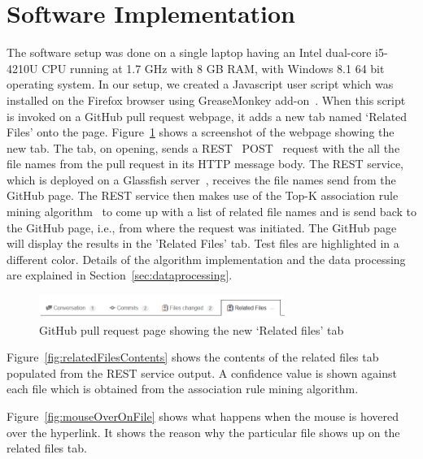 
\section{Software Implementation}
\label{sec:setup}

The software setup was done on a single laptop having an Intel dual-core i5-4210U CPU running at 1.7 GHz with 8 GB RAM, with Windows 8.1 64 bit operating system. In our setup, we created a Javascript user script which was installed on the Firefox browser using GreaseMonkey add-on~\cite{greasemonkey1,greasemonkey2}. When this script is invoked on a GitHub pull request webpage, it adds a new tab named `Related Files' onto the page. Figure~\ref{fig:newTabRelated} shows a screenshot of the webpage showing the new tab. The tab, on opening, sends a REST~\cite{rest} POST~\cite{post_http} request with the all the file names from the pull request in its HTTP message body. The REST service, which is deployed on a Glassfish server~\cite{glassfish}, receives the file names send from the GitHub page. The REST service then makes use of the Top-K association rule mining algorithm~\cite{fournier2012mining} to come up with a list of related file names and is send back to the GitHub page, i.e., from where the request was initiated. The GitHub page will display the results in the 'Related Files' tab. Test files are highlighted in a different color. Details of the algorithm implementation and the data processing are explained in Section~\ref{sec:dataprocessing}.

\begin{figure}[ht!]
\centering
\includegraphics[width=8cm]{NewTabRelatedFiles}
\caption{GitHub pull request page showing the new `Related files' tab}
\label{fig:newTabRelated}
\end{figure}

Figure~\ref{fig:relatedFilesContents} shows the contents of the related files tab populated from the REST service output. A confidence value is shown against each file which is obtained from the association rule mining algorithm.

Figure~\ref{fig:mouseOverOnFile} shows what happens when the mouse is hovered over the hyperlink. It shows the reason why the particular file shows up on the related files tab.

